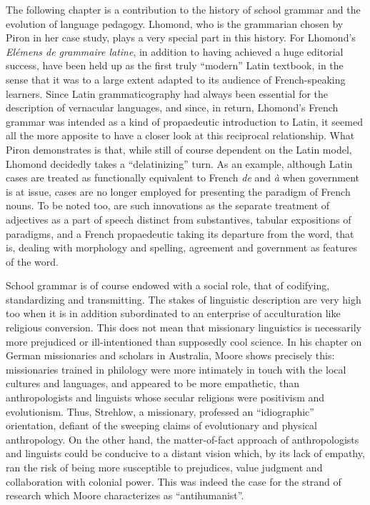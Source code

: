\documentclass[output=paper]{langsci/langscibook}
\begin{document}
The following chapter is a contribution to the history of school grammar and the evolution of language pedagogy. Lhomond, who is the grammarian chosen by Piron in her case study, plays a very special part in this history. For Lhomond's \emph{Elémens de grammaire latine}, in addition to having achieved a huge editorial success, have been held up as the first truly ``modern'' Latin textbook, in the sense that it was to a large extent adapted to its audience of French-speaking learners. Since Latin grammaticography had always been essential for the description of vernacular languages, and since, in return, Lhomond's French grammar was intended as a kind of propaedeutic introduction to Latin, it seemed all the more apposite to have a closer look at this reciprocal relationship. What Piron demonstrates is that, while still of course dependent on the Latin model, Lhomond decidedly takes a ``delatinizing'' turn. As an example, although Latin cases are treated as functionally equivalent to French \emph{de} and \emph{à} when government is at issue, cases are no longer employed for presenting the paradigm of French nouns. To be noted too, are such innovations as the separate treatment of adjectives as a part of speech distinct from substantives, tabular expositions of paradigms, and a French propaedeutic taking its departure from the word, that is, dealing with morphology and spelling, agreement and government as features of the word.

School grammar is of course endowed with a social role, that of codifying, standardizing and transmitting. The stakes of linguistic description are very high too when it is in addition subordinated to an enterprise of acculturation like religious conversion. This does not mean that missionary linguistics is necessarily more prejudiced or ill-intentioned than supposedly cool science. In his chapter on German missionaries and scholars in Australia, Moore shows precisely this: missionaries trained in philology were more intimately in touch with the local cultures and languages, and appeared to be more empathetic, than anthropologists and linguists whose secular religions were positivism and evolutionism. Thus, Strehlow, a missionary, professed an ``idiographic'' orientation, defiant of the sweeping claims of evolutionary and physical anthropology. On the other hand, the matter-of-fact approach of anthropologists and linguists could be conducive to a distant vision which, by its lack of empathy, ran the risk of being more susceptible to prejudices, value judgment and collaboration with colonial power. This was indeed the case for the strand of research which Moore characterizes as ``antihumanist''.
\end{document}

